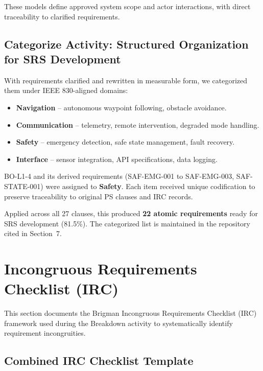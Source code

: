 \documentclass[11pt,a4paper]{article}
\begin{document}
These models define approved system scope and actor interactions, with direct traceability to clarified requirements.

\subsection{Categorize Activity: Structured Organization for SRS Development}

With requirements clarified and rewritten in measurable form, we categorized them under IEEE 830-aligned domains:

\begin{itemize}
    \item \textbf{Navigation} – autonomous waypoint following, obstacle avoidance.
    \item \textbf{Communication} – telemetry, remote intervention, degraded mode handling.
    \item \textbf{Safety} – emergency detection, safe state management, fault recovery.
    \item \textbf{Interface} – sensor integration, API specifications, data logging.
\end{itemize}

BO-L1-4 and its derived requirements (SAF-EMG-001 to SAF-EMG-003, SAF-STATE-001) were assigned to \textbf{Safety}. Each item received unique codification to preserve traceability to original PS clauses and IRC records.

Applied across all 27 clauses, this produced \textbf{22 atomic requirements} ready for SRS development (81.5\%). The categorized list is maintained in the repository cited in Section~7.

\section{Incongruous Requirements Checklist (IRC)}
\label{sec:irc}

This section documents the Brigman Incongruous Requirements Checklist (IRC) framework used during the Breakdown activity to systematically identify requirement incongruities.

\subsection{Combined IRC Checklist Template}
\end{document}
